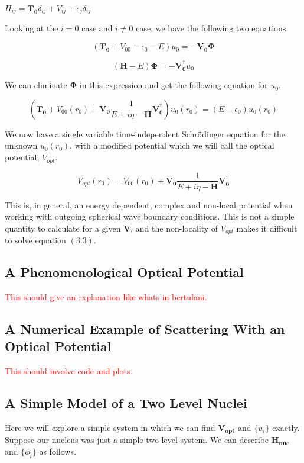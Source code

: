 \documentclass[12pt,letterpaper]{article}
\numberwithin{equation}{section}
\newcommand{\beq}{\begin{equation}}
\newcommand{\eeq}{\end{equation}}
\begin{document}
\begin{center}
$H_{ij} = \boldsymbol{T_0}\delta_{ij} + V_{ij} + \epsilon_j\delta_{ij}$
\end{center}

\noindent Looking at the  $i = 0$ case and $i \neq 0$ case, we have the following two equations.

\beq
(\boldsymbol{T_0} + V_{00} + \epsilon_0 - E)u_0 = -\boldsymbol{V_0}\boldsymbol{\Phi}
\eeq

\beq
(\boldsymbol{H} - E)\boldsymbol{\Phi} = -\boldsymbol{V_0^\dagger}u_0
\eeq

\noindent We can eliminate $\boldsymbol{\Phi}$ in this expression and get the following equation for $u_0$.

\beq
(\boldsymbol{T_0} + V_{00}(r_0) + \boldsymbol{V_0} \frac{1}{E + i\eta - \boldsymbol{H}} \boldsymbol{V_0^\dagger})u_0(r_0) = (E - \epsilon_0)u_0(r_0)
\eeq

We now have a single variable time-independent Schrödinger equation for the unknown $u_0(r_0)$, with a modified potential which we will call the optical potential, $V_{opt}$.

\beq
V_{opt}(r_0) = V_{00}(r_0) + \boldsymbol{V_0} \frac{1}{E + i\eta - \boldsymbol{H}} \boldsymbol{V_0^\dagger}
\eeq

This is, in general, an energy dependent, complex and non-local potential when working with outgoing spherical wave boundary conditions. This is not a simple quantity to calculate for a given $\boldsymbol{V}$, and the non-locality of $V_{opt}$ makes it difficult to solve equation $(3.3)$. 

\subsection{A Phenomenological Optical Potential}
\textcolor{red}{This should give an explanation like whats in bertulani.}

\subsection{A Numerical Example of Scattering With an Optical Potential}
\textcolor{red}{This should involve code and plots.}

\subsection{A Simple Model of a Two Level Nuclei}
Here we will explore a simple system in which we can find $\boldsymbol{V_{opt}}$ and $\{u_i\}$ exactly. Suppose our nucleus was just a simple two level system. We can describe $\boldsymbol{H_{nuc}}$ and $\{\phi_i\}$ as follows.
\end{document}

